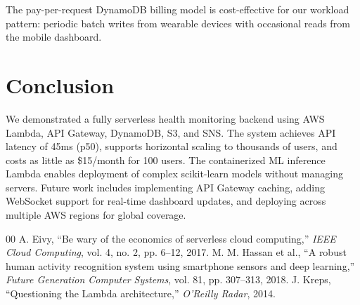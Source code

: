 \documentclass[conference]{IEEEtran}
\begin{document}
The pay-per-request DynamoDB billing model is cost-effective for our workload pattern: periodic batch writes from wearable devices with occasional reads from the mobile dashboard.

\section{Conclusion}
We demonstrated a fully serverless health monitoring backend using AWS Lambda, API Gateway, DynamoDB, S3, and SNS. The system achieves API latency of 45ms (p50), supports horizontal scaling to thousands of users, and costs as little as \$15/month for 100 users. The containerized ML inference Lambda enables deployment of complex scikit-learn models without managing servers. Future work includes implementing API Gateway caching, adding WebSocket support for real-time dashboard updates, and deploying across multiple AWS regions for global coverage.

\begin{thebibliography}{00}
 A. Eivy, ``Be wary of the economics of serverless cloud computing,'' \textit{IEEE Cloud Computing}, vol. 4, no. 2, pp. 6--12, 2017.
 M. M. Hassan et al., ``A robust human activity recognition system using smartphone sensors and deep learning,'' \textit{Future Generation Computer Systems}, vol. 81, pp. 307--313, 2018.
 J. Kreps, ``Questioning the Lambda architecture,'' \textit{O'Reilly Radar}, 2014.
\end{thebibliography}
\end{document}
